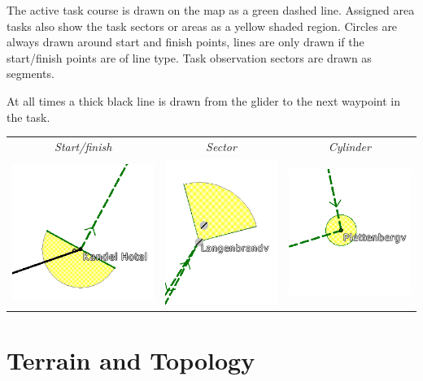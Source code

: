 The active task course is drawn on the map as a green dashed line.
Assigned area tasks also show the task sectors or areas as a yellow shaded
region.  
Circles are always drawn around start and finish points, lines are
only drawn if the start/finish points are of line type.  Task
observation sectors are drawn as segments.

At all times a thick black line is drawn from the glider to the next
waypoint in the task.

\begin{center}

\begin{tabular}{c c c}
{\it Start/finish} & {\it Sector} & {\it Cylinder} \\
\includegraphics[angle=0,width=0.3\linewidth,keepaspectratio='true']{figures/cut-startfinish.png} &
\includegraphics[angle=0,width=0.3\linewidth,keepaspectratio='true']{figures/cut-sector.png} &
\includegraphics[angle=0,width=0.3\linewidth,keepaspectratio='true']{figures/cut-barrel.png} \\
\end{tabular}
\end{center}


\section{Terrain and Topology}

